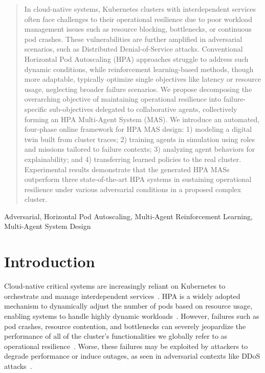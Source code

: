 \documentclass[conference]{IEEEtran}
\begin{document}
\maketitle

\begin{abstract}
    In cloud-native systems, Kubernetes clusters with interdependent services often face challenges to their operational resilience due to poor workload management issues such as resource blocking, bottlenecks, or continuous pod crashes. These vulnerabilities are further amplified in adversarial scenarios, such as Distributed Denial-of-Service attacks. Conventional Horizontal Pod Autoscaling (HPA) approaches struggle to address such dynamic conditions, while reinforcement learning-based methods, though more adaptable, typically optimize single objectives like latency or resource usage, neglecting broader failure scenarios.
    We propose decomposing the overarching objective of maintaining operational resilience into failure-specific sub-objectives delegated to collaborative agents, collectively forming an HPA Multi-Agent System (MAS). We introduce an automated, four-phase online framework for HPA MAS design: 1) modeling a digital twin built from cluster traces; 2) training agents in simulation using roles and missions tailored to failure contexts; 3) analyzing agent behaviors for explainability; and 4) transferring learned policies to the real cluster.
    Experimental results demonstrate that the generated HPA MASs outperform three state-of-the-art HPA systems in sustaining operational resilience under various adversarial conditions in a proposed complex cluster.

\end{abstract}

\begin{IEEEkeywords}
    Adversarial, Horizontal Pod Autoscaling, Multi-Agent Reinforcement Learning, Multi-Agent System Design
\end{IEEEkeywords}

\section{Introduction}
\label{sec:introduction}

Cloud-native critical systems are increasingly reliant on Kubernetes to orchestrate and manage interdependent services~\cite{Pahl2019}. HPA is a widely adopted mechanism to dynamically adjust the number of pods based on resource usage, enabling systems to handle highly dynamic workloads~\cite{Hohpe2012}. However, failures such as pod crashes, resource contention, and bottlenecks can severely jeopardize the performance of all of the cluster's functionalities we globally refer to as operational resilience~\cite{Burns2016}. Worse, these failures may be exploited by attackers to degrade performance or induce outages, as seen in adversarial contexts like DDoS attacks~\cite{Koller2019}.
\end{document}
